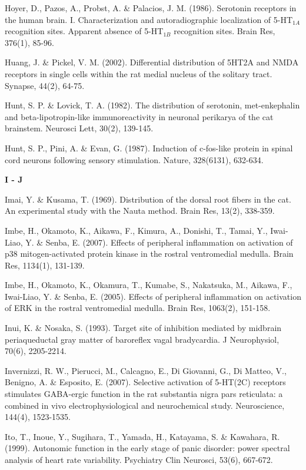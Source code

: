 \documentclass[a4paper,12pt,twoside]{report}
\begin{document}
\begin{singlespacing}
\begin{footnotesize}
Hoyer, D., Pazos, A., Probst, A. \& Palacios, J. M. (1986). Serotonin receptors in the human brain. I. Characterization and autoradiographic localization of 5-HT$_{1A}$ recognition sites. Apparent absence of 5-HT$_{1B}$ recognition sites. Brain Res, 376(1), 85-96.

Huang, J. \& Pickel, V. M. (2002). Differential distribution of 5HT2A and NMDA receptors in single cells within the rat medial nucleus of the solitary tract. Synapse, 44(2), 64-75.

Hunt, S. P. \& Lovick, T. A. (1982). The distribution of serotonin, met-enkephalin and beta-lipotropin-like immunoreactivity in neuronal perikarya of the cat brainstem. Neurosci Lett, 30(2), 139-145.

Hunt, S. P., Pini, A. \& Evan, G. (1987). Induction of c-fos-like protein in spinal cord neurons following sensory stimulation. Nature, 328(6131), 632-634.

\medskip
\begin{Large}\textbf{I - J}\end{Large}

Imai, Y. \& Kusama, T. (1969). Distribution of the dorsal root fibers in the cat. An experimental study with the Nauta method. Brain Res, 13(2), 338-359.

Imbe, H., Okamoto, K., Aikawa, F., Kimura, A., Donishi, T., Tamai, Y., Iwai-Liao, Y. \& Senba, E. (2007). Effects of peripheral inflammation on activation of p38 mitogen-activated protein kinase in the rostral ventromedial medulla. Brain Res, 1134(1), 131-139.

Imbe, H., Okamoto, K., Okamura, T., Kumabe, S., Nakatsuka, M., Aikawa, F., Iwai-Liao, Y. \& Senba, E. (2005). Effects of peripheral inflammation on activation of ERK in the rostral ventromedial medulla. Brain Res, 1063(2), 151-158.

Inui, K. \& Nosaka, S. (1993). Target site of inhibition mediated by midbrain periaqueductal gray matter of baroreflex vagal bradycardia. J Neurophysiol, 70(6), 2205-2214.

Invernizzi, R. W., Pierucci, M., Calcagno, E., Di Giovanni, G., Di Matteo, V., Benigno, A. \& Esposito, E. (2007). Selective activation of 5-HT(2C) receptors stimulates GABA-ergic function in the rat substantia nigra pars reticulata: a combined in vivo electrophysiological and neurochemical study. Neuroscience, 144(4), 1523-1535.

Ito, T., Inoue, Y., Sugihara, T., Yamada, H., Katayama, S. \& Kawahara, R. (1999). Autonomic function in the early stage of panic disorder: power spectral analysis of heart rate variability. Psychiatry Clin Neurosci, 53(6), 667-672.


\end{footnotesize}
\end{singlespacing}
\end{document}
